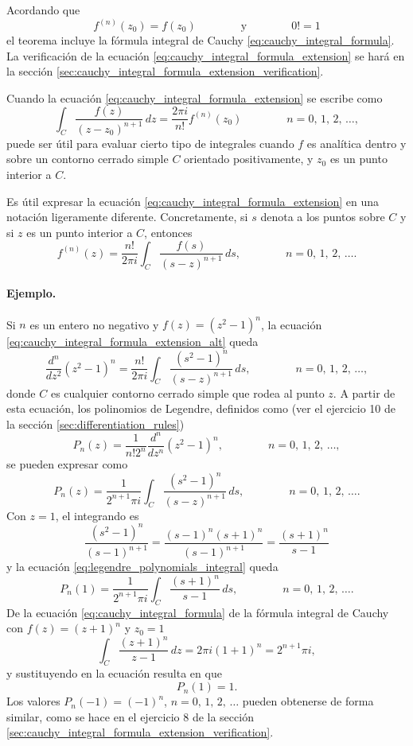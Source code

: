 \documentclass[a4paper]{report}
\begin{document}
Acordando que 
\[
 f^{(n)}(z_0)=f(z_0)
 \qquad\qquad\textrm{y}\qquad\qquad
 0!=1
\]
el teorema incluye la fórmula integral de Cauchy \ref{eq:cauchy_integral_formula}. La verificación de la ecuación \ref{eq:cauchy_integral_formula_extension} se hará en la sección \ref{sec:cauchy_integral_formula_extension_verification}.

Cuando la ecuación \ref{eq:cauchy_integral_formula_extension} se escribe como 
\[
 \int_{C}\frac{f(z)}{(z-z_0)^{n+1}}\,dz=\frac{2\pi i}{n!}f^{(n)}(z_0)
 \qquad\qquad 
 n=0,\,1,\,2,\,\dots,
\]
puede ser útil para evaluar cierto tipo de integrales cuando \(f\) es analítica dentro y sobre un contorno cerrado simple \(C\) orientado positivamente, y \(z_0\) es un punto interior a \(C\).

Es útil expresar la ecuación \ref{eq:cauchy_integral_formula_extension} en una notación ligeramente diferente. Concretamente, si \(s\) denota a los puntos sobre \(C\) y si \(z\) es un punto interior a \(C\), entonces
\begin{equation}\label{eq:cauchy_integral_formula_extension_alt}
 f^{(n)}(z)=\frac{n!}{2\pi i}\int_{C}\frac{f(s)}{(s-z)^{n+1}}\,ds,
 \qquad\qquad 
 n=0,\,1,\,2,\,\dots. 
\end{equation}

\paragraph{Ejemplo.} Si \(n\) es un entero no negativo y \(f(z)=(z^2-1)^n\), la ecuación \ref{eq:cauchy_integral_formula_extension_alt} queda
\[
 \frac{d^n}{dz^2}(z^2-1)^n=\frac{n!}{2\pi i}\int_{C}\frac{(s^2-1)^n}{(s-z)^{n+1}}\,ds,
 \qquad\qquad 
 n=0,\,1,\,2,\,\dots,
\]
donde \(C\) es cualquier contorno cerrado simple que rodea al punto \(z\). A partir de esta ecuación, los polinomios de Legendre, definidos como (ver el ejercicio 10 de la sección \ref{sec:differentiation_rules})
\[
 P_n(z)=\frac{1}{n!2^n}\frac{d^n}{dz^n}(z^2-1)^n,
 \qquad\qquad n=0,\,1,\,2,\,\dots,
\]
se pueden expresar como
\begin{equation}\label{eq:legendre_polynomials_integral}
 P_n(z)=\frac{1}{2^{n+1}\pi i}\int_{C}\frac{(s^2-1)^n}{(s-z)^{n+1}}\,ds,
 \qquad\qquad 
 n=0,\,1,\,2,\,\dots. 
\end{equation}
Con \(z=1\), el integrando es
\[
 \frac{(s^2-1)^n}{(s-1)^{n+1}}=\frac{(s-1)^n(s+1)^n}{(s-1)^{n+1}}=\frac{(s+1)^n}{s-1}
\]
y la ecuación \ref{eq:legendre_polynomials_integral} queda 
\[
  P_n(1)=\frac{1}{2^{n+1}\pi i}\int_{C}\frac{(s+1)^n}{s-1}\,ds,
 \qquad\qquad 
 n=0,\,1,\,2,\,\dots. 
\]
De la ecuación \ref{eq:cauchy_integral_formula} de la fórmula integral de Cauchy con \(f(z)=(z+1)^n\) y \(z_0=1\)
\[
 \int_C\frac{(z+1)^n}{z-1}\,dz=2\pi i(1+1)^n=2^{n+1}\pi i,
\]
y sustituyendo en la ecuación resulta en que 
\[
 P_n(1)=1.
\]
Los valores \(P_n(-1)=(-1)^n\), \(n=0,\,1,\,2,\,\dots\) pueden obtenerse de forma similar, como se hace en el ejercicio 8 de la sección \ref{sec:cauchy_integral_formula_extension_verification}.
\end{document}
